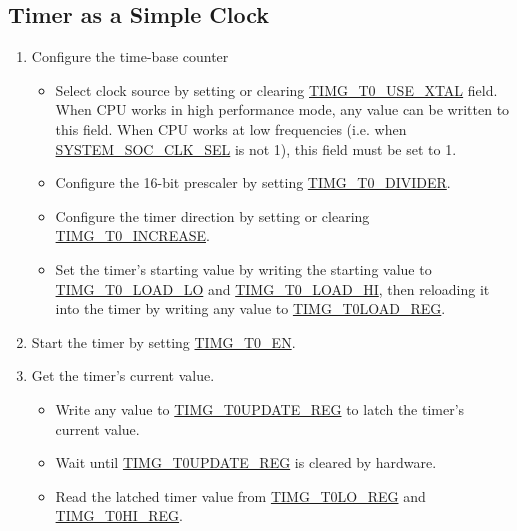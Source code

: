 \documentclass[main\_\_EN.tex]{subfiles}
\begin{document}
\subsection{Timer as a Simple Clock}\label{sec:timg-func-descr-simple-clock}
\begin{enumerate}
    \item Configure the time-base counter
    \begin{itemize}
        \item Select clock source by setting or clearing \hyperref[fielddesc:TIMGTXUSEXTAL]{TIMG\_T0\_USE\_XTAL} field. When CPU works in high performance mode, any value can be written to this field. When CPU works at low frequencies (i.e. when \hyperref[fielddesc:SYSTEMSOCCLKSEL]{SYSTEM\_SOC\_CLK\_SEL} is not 1), this field must be set to 1.
        \item Configure the 16-bit prescaler by setting \hyperref[fielddesc:TIMGTXDIVIDER]{TIMG\_T0\_DIVIDER}.
        \item Configure the timer direction by setting or clearing \hyperref[fielddesc:TIMGTXINCREASE]{TIMG\_T0\_INCREASE}.
        \item Set the timer's starting value by writing the starting value to \hyperref[fielddesc:TIMGTXLOADLO]{TIMG\_T0\_LOAD\_LO} and \hyperref[fielddesc:TIMGTXLOADHI]{TIMG\_T0\_LOAD\_HI}, then reloading it into the timer by writing any value to \hyperref[regdesc:TIMGTXLOADREG]{TIMG\_T0LOAD\_REG}.
    \end{itemize}
    \item Start the timer by setting \hyperref[fielddesc:TIMGTXEN]{TIMG\_T0\_EN}.
    \item Get the timer's current value.
    \begin{itemize}
        \item  Write any value to \hyperref[regdesc:TIMGTXUPDATEREG]{TIMG\_T0UPDATE\_REG} to latch the timer's current value.
        \item Wait until \hyperref[regdesc:TIMGTXUPDATEREG]{TIMG\_T0UPDATE\_REG} is cleared by hardware.
        \item  Read the latched timer value from \hyperref[regdesc:TIMGTXLOREG]{TIMG\_T0LO\_REG} and \hyperref[regdesc:TIMGTXHIREG]{TIMG\_T0HI\_REG}.   
    \end{itemize}   
\end{enumerate}
\end{document}

